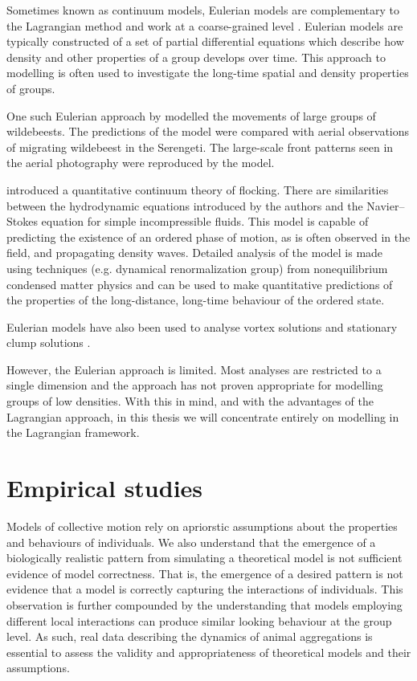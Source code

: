 Sometimes known as continuum models, Eulerian models are complementary to the Lagrangian method and work at a coarse-grained level \citep{giardina08}. Eulerian models are typically constructed of a set of partial differential equations which describe how density and other properties of a group develops over time. This approach to modelling is often used to investigate the long-time spatial and density properties of groups.

One such Eulerian approach by \citet{gueron93} modelled the movements of large groups of wildebeests. The predictions of the model were compared with aerial observations of migrating wildebeest in the Serengeti. The large-scale front patterns seen in the aerial photography were reproduced by the model.

\citet{toner98} introduced a quantitative continuum theory of flocking. There are similarities between the hydrodynamic equations introduced by the authors and the Navier--Stokes equation for simple incompressible fluids. This model is capable of predicting the existence of an ordered phase of motion, as is often observed in the field, and propagating density waves. Detailed analysis of the model is made using techniques (e.g. dynamical renormalization group) from nonequilibrium condensed matter physics and can be used to make quantitative predictions of the properties of the long-distance, long-time behaviour of the ordered state.

Eulerian models have also been used to analyse vortex solutions \citep{topaz04} and stationary clump solutions \citep{topaz06}.

However, the Eulerian approach is limited. Most analyses are restricted to a single dimension and the approach has not proven appropriate for modelling groups of low densities. With this in mind, and with the advantages of the Lagrangian approach, in this thesis we will concentrate entirely on modelling in the Lagrangian framework.

\section{Empirical studies}
\label{sec:empirical_studies}

Models of collective motion rely on apriorstic assumptions about the properties and behaviours of individuals. We also understand that the emergence of a biologically realistic pattern from simulating a theoretical model is not sufficient evidence of model correctness. That is, the emergence of a desired pattern is not evidence that a model is correctly capturing the interactions of individuals. This observation is further compounded by the understanding that models employing different local interactions can produce similar looking behaviour at the group level. As such, real data describing the dynamics of animal aggregations is essential to assess the validity and appropriateness of theoretical models and their assumptions.

